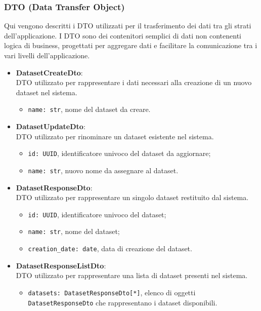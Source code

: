 \subsubsection{DTO (Data Transfer Object)}
\label{subsubsec:DTO}
Qui vengono descritti i DTO utilizzati per il trasferimento dei dati tra gli strati dell'applicazione.
I DTO sono dei contenitori semplici di dati non contenenti logica di business, progettati per aggregare dati e facilitare la comunicazione tra i vari livelli dell'applicazione.
\begin{itemize}
    \item \textbf{DatasetCreateDto}:\\
    DTO utilizzato per rappresentare i dati necessari alla creazione di un nuovo dataset nel sistema.
    \begin{itemize}
        \item \texttt{name: str}, nome del dataset da creare.
    \end{itemize}

    \item \textbf{DatasetUpdateDto}:\\
    DTO utilizzato per rinominare un dataset esistente nel sistema.
    \begin{itemize}
        \item \texttt{id: UUID}, identificatore univoco del dataset da aggiornare;
        \item \texttt{name: str}, nuovo nome da assegnare al dataset.
    \end{itemize}

    \item \textbf{DatasetResponseDto}:\\
    DTO utilizzato per rappresentare un singolo dataset restituito dal sistema.
    \begin{itemize}
        \item \texttt{id: UUID}, identificatore univoco del dataset;
        \item \texttt{name: str}, nome del dataset;
        \item \texttt{creation\_date: date}, data di creazione del dataset.
    \end{itemize}

    \item \textbf{DatasetResponseListDto}:\\
    DTO utilizzato per rappresentare una lista di dataset presenti nel sistema.
    \begin{itemize}
        \item \texttt{datasets: DatasetResponseDto[*]}, elenco di oggetti \texttt{DatasetResponseDto} che rappresentano i dataset disponibili.
    \end{itemize}
\end{itemize}
